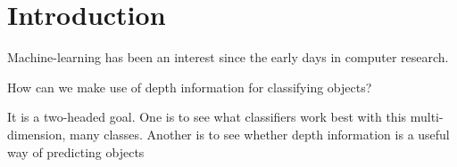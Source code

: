 \documentclass[dissertation.tex]{subfiles}
\begin{document}
\chapter{Introduction}
Machine-learning has been an interest since the early days in computer research. 

How can we make use of depth information for classifying objects?

It is a two-headed goal. One is to see what classifiers work best with this multi-dimension, many classes. Another is to see whether depth information is a useful way of predicting objects
\end{document}
